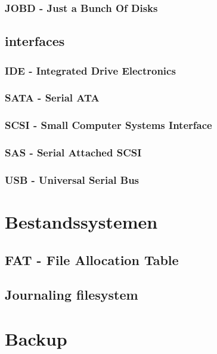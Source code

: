 \documentclass[a4paper,12pt,twoside,openright,titlepage]{book}
\begin{document}
\subsection{JOBD - Just a Bunch Of Disks}

\section{interfaces}
\subsection{IDE - Integrated Drive Electronics}
\subsection{SATA - Serial ATA}
\subsection{SCSI - Small Computer Systems Interface}

\subsection{SAS - Serial Attached SCSI}
\subsection{USB - Universal Serial Bus}

\chapter{Bestandssystemen}

\section{FAT - File Allocation Table}
\section{Journaling filesystem}

\chapter{Backup}
\end{document}
